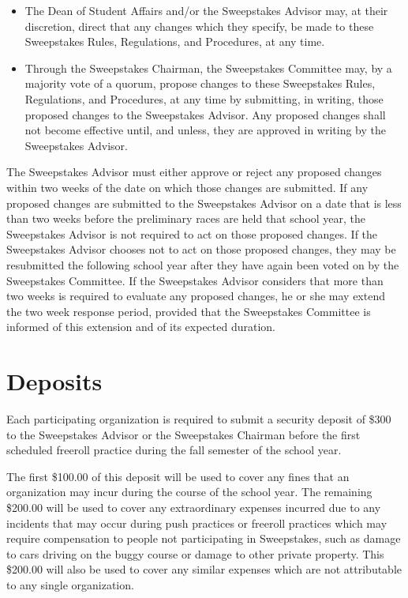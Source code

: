 	\begin{itemize}

		\item
		The Dean of Student Affairs and/or the Sweepstakes Advisor may, at their
		discretion, direct that any changes which they specify, be made to these
		Sweepstakes Rules, Regulations, and Procedures, at any time.

		\item
		Through the Sweepstakes Chairman, the Sweepstakes Committee may, by a majority
		vote of a quorum, propose changes to these Sweepstakes Rules, Regulations, and
		Procedures, at any time by submitting, in writing, those proposed changes to
		the Sweepstakes Advisor. Any proposed changes shall not become effective until,
		and unless, they are approved in writing by the Sweepstakes Advisor.

	\end{itemize}

	The Sweepstakes Advisor must either approve or reject any proposed changes within two
	weeks of the date on which those changes are submitted. If any proposed changes
	are submitted to the Sweepstakes Advisor on a date that is less than two weeks before the
	preliminary races are held that school year, the Sweepstakes Advisor is not required to
	act on those proposed changes. If the Sweepstakes Advisor chooses not to act on those
	proposed changes, they may be resubmitted the following school year after they
	have again been voted on by the Sweepstakes Committee. If the Sweepstakes Advisor
	considers that more than two weeks is required to evaluate any proposed
	changes, he or she may extend the two week response period, provided that the
	Sweepstakes Committee is informed of this extension and of its expected
	duration.

\section{Deposits}
\label{Deposits}

	Each participating organization is required to submit a security deposit of
	\$300 to the Sweepstakes Advisor or the Sweepstakes Chairman before the first
	scheduled freeroll practice during the fall semester of the school year.

	The first \$100.00 of this deposit will be used to cover any fines that an
	organization may incur during the course of the school year. The remaining
	\$200.00 will be used to cover any extraordinary expenses incurred due to any
	incidents that may occur during push practices or freeroll practices which may
	require compensation to people not participating in Sweepstakes, such as damage
	to cars driving on the buggy course or damage to other private property. This
	\$200.00 will also be used to cover any similar expenses which are not
	attributable to any single organization.

